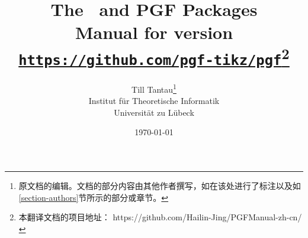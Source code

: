 \documentclass{ltxdoc}
\begin{document}



\title{\bfseries The \tikzname\ and {\Large PGF} Packages\\
  \large Manual for version \pgfversion\\[1mm]
\large\href{https://github.com/pgf-tikz/pgf}{\texttt{https://github.com/pgf-tikz/pgf}}\footnote{本翻译文档的项目地址： https://github.com/Hailin-Jing/PGFManual-zh-cn/}}
\author{Till Tantau\footnote{原文档的编辑。文档的部分内容由其他作者撰写，如在该处进行了标注以及如\ref{section-authors}节所示的部分或章节。}\\
  \normalsize Institut für Theoretische Informatik\\[-1mm]
  \normalsize Universität zu Lübeck}
\date{\today}

\maketitle

\tableofcontents

\clearpage





% 


% 
% 
% 
% 
% 
    
\end{document}
